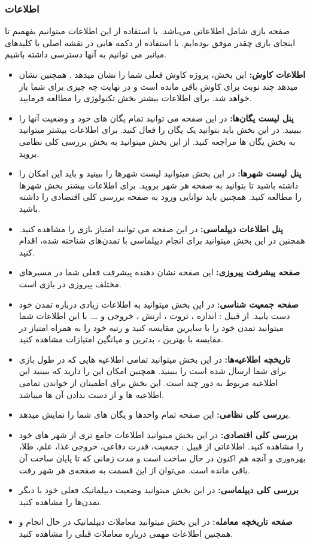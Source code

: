 \documentclass[]{article}
\begin{document}
\subsubsection*{{\titr اطلاعات}} %
صفحه بازی شامل اطلاعاتی می‌باشد. با استفاده از این اطلاعات میتوانیم بفهمیم تا اینجای بازی چقدر موفق بوده‌ایم. با استفاده از دکمه هایی در نقشه اصلی یا کلیدهای میانبر می توانیم به آنها دسترسی داشته باشیم.
\begin{itemize}
	\item \textbf{اطلاعات کاوش:} این بخش، پروژه کاوش فعلی شما را نشان میدهد . همچنین نشان میدهد چند نوبت برای کاوش باقی مانده است و در نهایت چه چیزی برای شما باز خواهد شد. برای اطلاعات بیشتر بخش تکنولوژی را مطالعه فرمایید. 
	\item \textbf{پنل لیست یگان‌ها:} در این صفحه می توانید تمام یگان های خود و وضعیت آنها را ببینید. در این بخش باید بتوانید یک یگان را فعال کنید. برای اطلاعات بیشتر میتوانید به بخش یگان ها مراجعه کنید.
	از این بخش میتوانید به بخش بررسی کلی نظامی بروید.
	\item \textbf{پنل لیست شهرها:} در این بخش میتوانید لیست شهرها را ببینید و باید این امکان را داشته باشید تا بتوانید به صفحه هر شهر بروید. برای اطلاعات بیشتر بخش شهرها را مطالعه کنید.
	همچنین باید توانایی ورود به صفحه بررسی کلی اقتصادی را داشته باشید.
	\item \textbf{پنل اطلاعات دیپلماسی:} در این صفحه می توانید امتیاز بازی را مشاهده کنید. همچنین در این بخش میتوانید برای انجام دیپلماسی با تمدن‌های شناخته شده، اقدام کنید.
	\item \textbf{صفحه پیشرفت پیروزی:} این صفحه نشان دهنده پیشرفت فعلی شما در مسیرهای مختلف پیروزی در بازی است.
	\item \textbf{صفحه جمعیت شناسی:} در این بخش میتوانید به اطلاعات زیادی درباره تمدن خود دست یابید. از قبیل : اندازه ، ثروت ، ارتش ، خروجی و \dots . با این اطلاعات شما میتوانید تمدن خود را با سایرین مقایسه کنید و رتبه خود را به همراه امتیاز در مقایسه با بهترین ، بدترین و میانگین امتیازات مشاهده کنید.
	\item \textbf{تاریخچه اطلاعیه‌ها:} در این بخش میتوانید تمامی اطلاعیه هایی که در طول بازی برای شما ارسال شده است را ببینید. همچنین امکان این را دارید که ببینید این اطلاعیه مربوط به دور چند است. این بخش برای اطمینان از خواندن تمامی اطلاعیه ها و از دست ندادن آن ها میباشد.
	\item \textbf{بررسی کلی نظامی:} این صفحه تمام واحدها و یگان های شما را نمایش میدهد.
	\item \textbf{بررسی کلی اقتصادی:} در این بخش میتوانید اطلاعات جامع تری از شهر های خود را مشاهده کنید. اطلاعاتی از قبیل : جمعیت، قدرت دفاعی، خروجی غذا، علم، طلا، بهره‌وری و آنچه هم اکنون در حال ساخت است و مدت زمانی که تا پایان ساخت آن باقی مانده است.
	می‌توان از این قسمت به صفحه‌ی هر شهر رفت.
	\item \textbf{بررسی کلی دیپلماسی:} در این بخش میتوانید وضعیت دیپلماتیک فعلی خود با دیگر تمدن‌ها را مشاهده کنید. 
	\item \textbf{صفحه تاریخچه معامله:} در این بخش میتوانید معاملات دیپلماتیک در حال انجام و همچنین اطلاعات مهمی درباره معاملات قبلی را مشاهده کنید.
\end{itemize}
\end{document}
